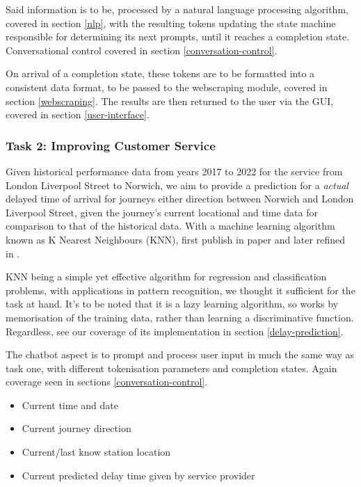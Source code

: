 \documentclass[11pt]{article}
\newcounter{subsubsubsection}[subsubsection]
\begin{document}
Said information is to be, processed by a natural language processing algorithm, covered in section \ref{nlp}, with the resulting tokens updating the state machine responsible for determining its next prompts, until it reaches a completion state. Conversational control covered in section \ref{conversation-control}.

On arrival of a completion state, these tokens are to be formatted into a consistent data format, to be passed to the webscraping module, covered in section \ref{webscraping}. The results are then returned to the user via the GUI, covered in section \ref{user-interface}.

\subsubsection{Task 2: Improving Customer Service} \label{task2-aims-objectives}

Given historical performance data from years 2017 to 2022 for the service from London Liverpool Street to Norwich, we aim to provide a prediction for a \textit{actual} delayed time of arrival for journeys either direction between Norwich and London Liverpool Street, given the journey's current locational and time data for comparison to that of the historical data. With a machine learning algorithm known as K Nearest Neighbours (KNN), first publish in paper \cite{knn-origin} and later refined in \cite{knn-refine}.

KNN being a simple yet effective algorithm for regression and classification problems, with applications in pattern recognition, we thought it sufficient for the task at hand. It's to be noted that it is a lazy learning algorithm, so works by memorisation of the training data, rather than learning a discriminative function. Regardless, see our coverage of its implementation in section \ref{delay-prediction}.

The chatbot aspect is to prompt and process user input in much the same way as task one, with different tokenisation parameters and completion states. Again coverage seen in sections \ref{conversation-control}.

\begin{itemize}
    \item Current time and date
    \item Current journey direction
    \item Current/last know station location
    \item Current predicted delay time given by service provider
\end{itemize}
\end{document}
